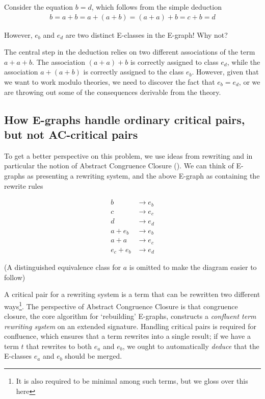 \documentclass{article}
\theoremstyle{definition}
\begin{document}
Consider the equation $b = d$, which follows from the simple deduction
\begin{align*}
	b = a + b = a + (a + b) = (a + a) + b = c + b = d
\end{align*}

However, $e_b$ and $e_d$ are two distinct E-classes in the E-graph! Why not?

The central step in the deduction relies on two different associations of the term $a + a + b$. The association $(a + a) + b$ is correctly assigned to class $e_d$, while the association $a + (a + b)$ is correctly assigned to the class $e_b$. However, given that we want to work modulo theories, we need to discover the fact that $e_b = e_d$, or we are throwing out some of the consequences derivable from the theory.

\subsection{How E-graphs handle ordinary critical pairs, but not AC-critical pairs}
To get a better perspective on this problem, we use ideas from rewriting and in particular the notion of Abstract Congruence Closure (\citep{bachmair_abstract_2000_short}). We can think of E-graphs as presenting a rewriting system, and the above E-graph as containing the rewrite rules

\begin{align*}
  b &\rightarrow e_b \\
  c &\rightarrow e_c \\
  d &\rightarrow e_d \\
	a + e_b &\rightarrow e_b \\
	a + a &\rightarrow e_c \\
	e_c + e_b &\rightarrow e_d
\end{align*}

(A distinguished equivalence class for $a$ is omitted to make the diagram easier to follow)

A critical pair for a rewriting system is a term that can be rewritten two different ways\footnote{It is also required to be minimal among such terms, but we gloss over this here}.
The perspective of Abstract Congruence Closure is that congruence closure, the core algorithm for `rebuilding' E-graphs, constructs a \emph{confluent term rewriting system} on an extended signature. Handling critical pairs is required for confluence, which ensures that a term rewrites into a single result; if we have a term $t$ that rewrites to both $e_a$ and $e_b$, we ought to automatically \emph{deduce} that the E-classes $e_a$ and $e_b$ should be merged.
\end{document}
